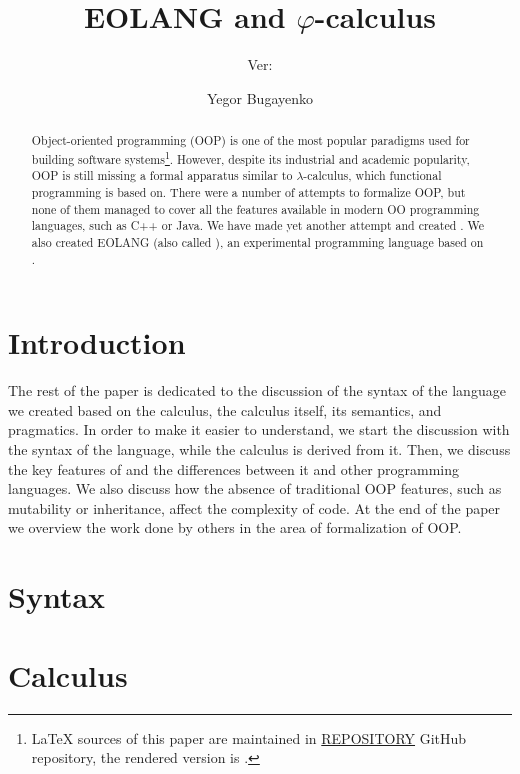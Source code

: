 \documentclass[sigplan,nonacm,natbib=false]{acmart}
\title{EOLANG and \texorpdfstring{$\varphi$}{phi}-calculus}
\subtitle{%
  Ver:
  \texorpdfstring{
    \href{https://github.com/REPOSITORY/releases/tag/0.0.0}
      {\ff{0.0.0}}
  }{0.0.0}
}
\author{Yegor Bugayenko}
\affiliation{
  \institution{Huawei}
  \city{Moscow}
  \country{Russia}
}
\begin{document}
\begin{abstract}
Object-oriented programming (OOP) is one of the most popular
paradigms used for building software systems\footnote{%
  \LaTeX{} sources of this paper are maintained in
  \href{https://github.com/REPOSITORY}{REPOSITORY} GitHub repository,
  the rendered version is \href{https://github.com/REPOSITORY/releases/tag/0.0.0}{}.}.
However, despite
its industrial and academic popularity, OOP is still missing
a formal apparatus similar to $\lambda$-calculus, which functional
programming is based on. There were a number of attempts to formalize
OOP, but none of them managed to cover all the features available in
modern OO programming languages, such as C++ or Java.
We have made yet another attempt and created \phic{}. We also
created EOLANG (also called \eolang{}), an experimental
programming language based on \phic{}.
\end{abstract}

\maketitle

\section{Introduction}
\label{sec:intro}



The rest of the paper is dedicated to the discussion of the
syntax of the language we created based on the calculus,
the calculus itself, its semantics, and pragmatics.
In order to make it easier to understand, we start
the discussion with the syntax of the language, while the calculus
is derived from it. Then, we discuss the
key features of \eolang{} and the differences between it and other
programming languages. We also discuss how the absence of traditional
OOP features, such as mutability or inheritance, affect the complexity of code.
At the end of the paper we overview the work done by others in the area of
formalization of OOP.

\section{Syntax}
\label{sec:syntax}


\section{Calculus}
\label{sec:calculus}

\end{document}
